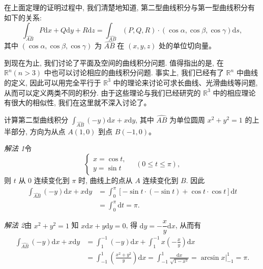 \documentclass[UTF8,12pt,a4paper,fontset=fandol]{ctexart}
\begin{document}
\begin{remark}\quad 在上面定理的证明过程中, 我们清楚地知道, 第二型曲线积分与第一型曲线积分有如下的关系:
\[
  \int_{\widehat{AB}}P\mathrm dx+Q\mathrm dy+R\mathrm dz
  =\int_{\widehat{AB}}(P,Q,R)\cdot(\cos\alpha,\cos\beta,\cos\gamma)\mathrm ds,
\]
其中 $(\cos\alpha,\cos\beta,\cos\gamma)$ 为 $\widehat{AB}$ 在 $(x,y,z)$ 处的单位切向量。

到现在为止, 我们讨论了平面及空间的曲线积分问题. 值得指出的是, 在 $\mathbb R^n(n>3)$ 中也可以讨论相应的曲线积分问题. 事实上, 我们已经有了 $\mathbb R^n$ 中曲线的定义, 因此可以用完全平行于 $\mathbb R^3$ 中的理论来讨论可求长曲线、光滑曲线等问题, 从而可以定义两类不同的积分. 由于这些理论与我们已经研究的 $\mathbb R^3$ 中的相应理论有很大的相似性, 我们在这里就不深入讨论了。

\end{remark}
\begin{example}\label{course-example-16-2-1}\quad 计算第二型曲线积分 $\int_{\widehat{AB}}(-y)\mathrm dx+x\mathrm dy$, 其中 $\widehat{AB}$ 为单位圆周 $x^2+y^2=1$ 的上半部分, 方向为从点 $A(1,0)$ 到点 $B(-1,0)$。

\end{example}
\noindent\emph{解法 1}\quad 令
\[
  \begin{cases}
    x=\cos t,\\
    y=\sin t
  \end{cases}
  \quad(0\leqslant t\leqslant\pi),
\]
则 $t$ 从 $0$ 连续变化到 $\pi$ 时, 曲线上的点从 $A$ 连续变化到 $B$. 因此
\[
\begin{aligned}
  \int_{\widehat{AB}}(-y)\mathrm dx+x\mathrm dy
  &=\int_0^\pi[-\sin t\cdot(-\sin t)+\cos t\cdot\cos t]\mathrm dt\\
  &=\int_0^\pi\mathrm dt=\pi.
\end{aligned}
\]

\noindent\emph{解法 2}\quad 由 $x^2+y^2=1$ 知 $x\mathrm dx+y\mathrm dy=0$, 得 $\mathrm dy=-\dfrac{x}{y}\mathrm dx$, 从而有
\[
\begin{aligned}
  \int_{\widehat{AB}}(-y)\mathrm dx+x\mathrm dy
  &=\int_1^{-1}(-y)\mathrm dx+\int_1^{-1}x\left(-\frac{x}{y}\right)\mathrm dx\\
  &=\int_{-1}^1\left(\frac{x^2+y^2}{y}\right)\mathrm dx
    =\int_{-1}^1\frac{\mathrm dx}{\sqrt{1-x^2}}
    =\arcsin x\bigg|_{-1}^1=\pi.
\end{aligned}
\]
\end{document}
